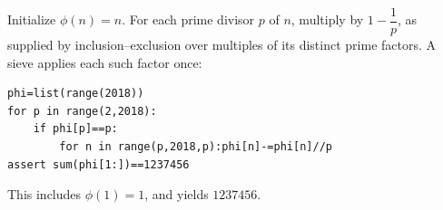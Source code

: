 Initialize $\phi(n)=n $. For each prime divisor $ p $ of $ n $, multiply by $ 1-\dfrac{1}{p}$, as supplied by inclusion--exclusion over multiples of its distinct prime factors. A sieve applies each such factor once:
\begin{verbatim}
phi=list(range(2018))
for p in range(2,2018):
    if phi[p]==p:
        for n in range(p,2018,p):phi[n]-=phi[n]//p
assert sum(phi[1:])==1237456
\end{verbatim}
This includes $\phi(1)=1 $, and yields $\boxed{1237456}$.
